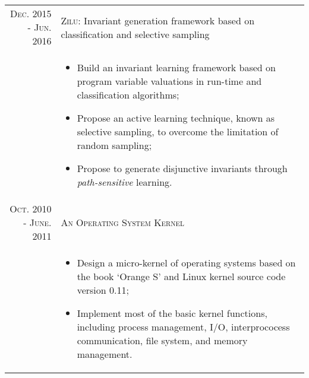 \documentclass[a4paper,10pt]{article}
\begin{document}
\begin{tabular}{rp{11cm}}
\textsc{Dec.} 2015 - \textsc{Jun.} 2016 & \textsc{Zilu:}   \footnotesize{Invariant generation framework based on classification and selective sampling}\\
&\footnotesize{
\begin{itemize}
	\item Build an invariant learning framework based on program variable valuations in run-time and classification algorithms;
	\item Propose an active learning technique, known as selective sampling, to overcome the limitation of random sampling;
	\item Propose to generate disjunctive invariants through {\em path-sensitive} learning.
\end{itemize}
}\\


\textsc{Oct.} 2010 - \textsc{June.} 2011 & \textsc{An Operating System Kernel} \\
&\footnotesize{
\begin{itemize}
	\item Design a micro-kernel of operating systems based on the book `Orange S' and Linux kernel source code version 0.11;
	\item Implement most of the basic kernel functions, including process management, I/O, interprococess communication, file system, and memory management.
\end{itemize}
} \\
\end{tabular}
\end{document}

